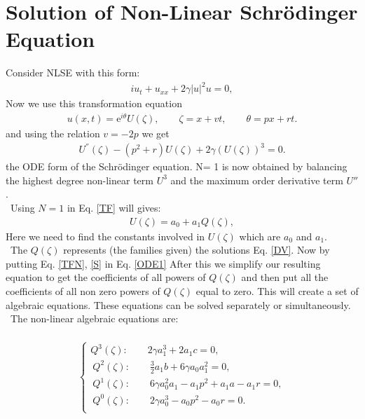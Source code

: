 \documentclass{article}
\numberwithin{equation}{section}
\begin{document}
\section{Solution of Non-Linear Schr\"{o}dinger Equation }
Consider NLSE with this form:
\begin{eqnarray}\label{NLSE}
i u_{t}+u_{\mathit{xx}}+2 \gamma  {| u |}^{2} u = 0,
\end{eqnarray}
Now we use this transformation equation
 \begin{eqnarray}\label{TFN}
u \! \left(x , t\right) ={\mathrm e}^{i\theta} U \! \left(\zeta \right),   \qquad \zeta = x + v t,  \qquad \theta = p x + r t.
\end{eqnarray}
and using the relation $v=-2p$ we get
\begin{eqnarray}\label{ODE1}
U^{''}{(\zeta)}-\left(p^{2}+r \right) U \! \left(\zeta \right)+2 \gamma \! \left(U \! \left(\zeta \right)\right)^{3}=0.
\end{eqnarray}
the ODE form of the Schr\"{o}dinger equation. N= 1 is now obtained by balancing the highest degree non-linear term $U^{3}$ and the maximum order derivative term $U''$.\\\
Using $N=1$ in Eq. \ref{TF} will gives:
\begin{eqnarray}\label{S}
U \! \left(\zeta \right)= a_{0} + a_{1} Q \! \left(\zeta \right),
\end{eqnarray}
Here we need to find the constants involved in $U{(\zeta)}$ which are $a_{0}$ and $a_{1}$.\\\
The $Q{(\zeta)}$ represents (the families given) the solutions Eq. \ref{DV}. Now by putting Eq. \ref{TFN}, \ref{S} in Eq. \ref{ODE1} After this we simplify our resulting equation to get the coefficients of all powers of ${Q(\zeta)}$ and then put all the coefficients of all non zero powers of $Q{(\zeta)}$ equal to zero. This will create a set of algebraic equations. These equations can be solved separately or simultaneously.\\\
The non-linear algebraic equations are:\\\
\begin{align}
\begin{cases}
Q^{3}{(\zeta)}:\qquad2 \gamma  a_{1}^{3}+2 a_{1} c = 0,\\\
Q^{2}{(\zeta)}:\qquad\frac{3}{2} a_{1} b +6 \gamma  a_{0} a_{1}^{2} = 0,\\\
Q^{1}{(\zeta)}:\qquad6 \gamma  a_{0}^{2} a_{1}-a_{1} p^{2}+a_{1} a -a_{1} r = 0,\\\
Q^{0}{(\zeta)}:\qquad2 \gamma  a_{0}^{3}-a_{0} p^{2}-a_{0} r = 0.\\\
\end{cases}
\end{align}
\end{document}
